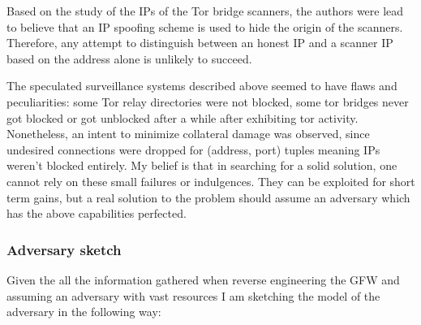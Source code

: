 \documentclass[11pt]{article} %
\begin{document}
Based on the study of the IPs of the Tor bridge scanners, the authors were lead to believe that an IP spoofing scheme is used to hide the origin of the scanners. Therefore, any attempt to distinguish between an honest IP and a scanner IP based on the address alone is unlikely to succeed. 

The speculated surveillance systems described above seemed to have flaws and peculiarities: some Tor relay directories were not blocked, some tor bridges never got blocked or got unblocked after a while after exhibiting tor activity. Nonetheless, an intent to minimize collateral damage was observed, since undesired connections were dropped for (address, port) tuples meaning IPs weren’t blocked entirely.  My belief is that in searching for a solid solution, one cannot rely on these small failures or indulgences. They can be exploited for short term gains, but a real solution to the problem should assume an adversary which has the above capabilities perfected.

\subsubsection{Adversary sketch}

Given the all the information gathered when reverse engineering the GFW and assuming an adversary with vast resources I am sketching the model of the adversary in the following way:
\end{document}
